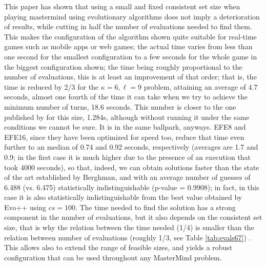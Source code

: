 \documentclass[conference]{IEEEtran}
\begin{document}
This paper has shown that using a small and fixed consistent set size
when playing mastermind using evolutionary algorithms does not imply a
deterioration of results, while cutting in half the number of
evaluations needed to find them. This makes the configuration of
the algorithm shown quite suitable for real-time games such as mobile apps
or web games; the actual time varies from less than one second for the
smallest configuration to a few seconds for the whole game in the
biggest configuration shown; the time being roughly proportional to
the number of evaluations, this is at least an improvement of that
order; that is, the time is reduced by 2/3 for the $\kappa=6,\ell=9$
problem, attaining an average of 4.7 seconds, almost one fourth of the
time it can take when we try to achieve the minimum number of turns,
18.6 seconds. This number is closer to the one published by
\cite{Berghman20091880} for this size, 1.284s, although without
running it under the same conditions we cannot be sure. It is in the
same ballpark, anyways. EFE8 and EFE16, since they have been optimized
for speed too, reduce that time even further to an median of 0.74 and
0.92 seconds, respectively (averages are 1.7 and 0.9; in the first
case it is much higher due to the presence of an execution that took
4000 seconds), so that, indeed, we can obtain solutions faster than
the state of the art established by Berghman, and with an average
number of guesses of 6.488 (vs. 6.475) statistically indistinguishable
(p-value = 0.9908); in fact, in this case it is also statistically
indistinguishable from the best value obtained by Evo++ using $cs=100$. 
The time needed to find the solution has a strong
component in the number of evaluations, but it also depends on the
consistent set size, that is why the relation between the time
needed (1/4) is smaller than the relation between number of
evaluations (roughly 1/3, see Table \ref{tab:evals67}) . This allows
also to extend the range of 
feasible sizes, and yields a robust configuration that can be used
throughout any MasterMind problem. 
\end{document}
